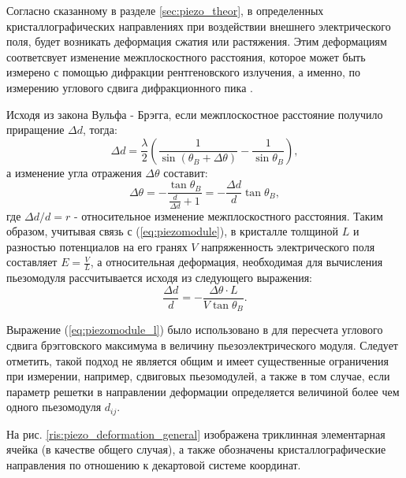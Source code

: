 \label{sec:pieao_method}
Согласно сказанному в разделе \ref{sec:piezo_theor}, в определенных кристаллографических
направлениях при воздействии внешнего электрического поля, будет возникать деформация
сжатия или растяжения. Этим деформациям соответсвует изменение межплоскостного
 расстояния, которое может быть измерено с помощью дифракции рентгеновского
 излучения, а именно, по измерению углового сдвига дифракционного пика \cite{marchenkov2014}.

Исходя из закона Вульфа - Брэгга, если межплоскостное расстояние получило приращение
$\Delta d$, тогда:
$$ \Delta d = \frac{\lambda}{2}\left( \frac{1}{\sin(\theta_B + \Delta \theta) } - \frac{1}{\sin \theta_B } \right), $$
\noindent
а изменение угла отражения $\Delta \theta$ составит:
\begin{equation}
   \Delta \theta =-  \frac{\tan \theta_B}{\frac{d}{\Delta d}+1}  = -  \frac{\Delta d }{d}  \tan \theta_B,
\end{equation}
\noindent
где $\Delta d/d = r$ - относительное изменение межплоскостного расстояния.
Таким образом, учитывая связь с
(\ref{eq:piezomodule}),  в кристалле толщиной $L$ и разностью потенциалов на его
гранях $V$ напряженность электрического поля составляет $E = \frac{V}{L}$, а
относительная деформация, необходимая для вычисления пьезомодуля
 рассчитывается исходя из следующего выражения:
 \begin{equation}
    \frac{\Delta d}{d}  = -\frac{\Delta \theta \cdot L}{V \tan \theta_B}.
    \label{eq:piezomodule_l}
 \end{equation}

Выражение (\ref{eq:piezomodule_l}) было использовано в
\cite{kibalin2015, marchenkov2014,piezo101,piezo102} для
пересчета углового сдвига брэгговского максимума в величину пьезоэлектрического модуля.
Следует отметить, такой подход не является общим и имеет существенные ограничения при
измерении, например, сдвиговых пьезомодулей, а также в том случае, если параметр решетки
в направлении деформации определяется величиной более чем одного пьезомодуля $d_{ij}$.

На рис. \ref{ris:piezo_deformation_general} изображена триклинная элементарная ячейка
(в качестве общего случая),
а также обозначены кристаллографические направления по отношению к декартовой
системе координат.

